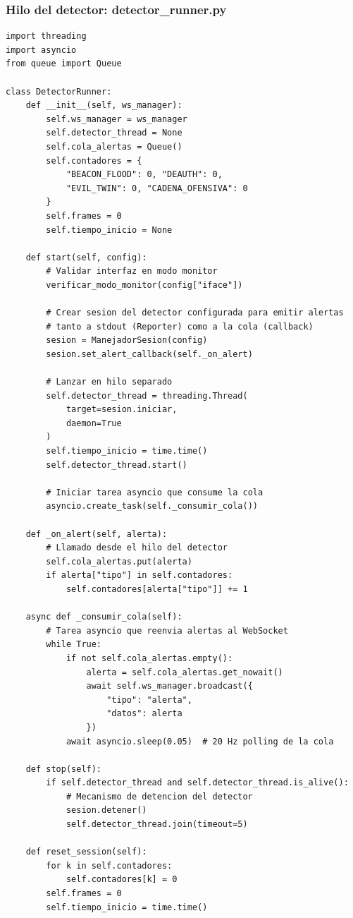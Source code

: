 \documentclass[11pt,a4paper]{article}
\begin{document}
\subsubsection{Hilo del detector: detector_runner.py}

\begin{lstlisting}
import threading
import asyncio
from queue import Queue

class DetectorRunner:
    def __init__(self, ws_manager):
        self.ws_manager = ws_manager
        self.detector_thread = None
        self.cola_alertas = Queue()
        self.contadores = {
            "BEACON_FLOOD": 0, "DEAUTH": 0,
            "EVIL_TWIN": 0, "CADENA_OFENSIVA": 0
        }
        self.frames = 0
        self.tiempo_inicio = None

    def start(self, config):
        # Validar interfaz en modo monitor
        verificar_modo_monitor(config["iface"])

        # Crear sesion del detector configurada para emitir alertas
        # tanto a stdout (Reporter) como a la cola (callback)
        sesion = ManejadorSesion(config)
        sesion.set_alert_callback(self._on_alert)

        # Lanzar en hilo separado
        self.detector_thread = threading.Thread(
            target=sesion.iniciar,
            daemon=True
        )
        self.tiempo_inicio = time.time()
        self.detector_thread.start()

        # Iniciar tarea asyncio que consume la cola
        asyncio.create_task(self._consumir_cola())

    def _on_alert(self, alerta):
        # Llamado desde el hilo del detector
        self.cola_alertas.put(alerta)
        if alerta["tipo"] in self.contadores:
            self.contadores[alerta["tipo"]] += 1

    async def _consumir_cola(self):
        # Tarea asyncio que reenvia alertas al WebSocket
        while True:
            if not self.cola_alertas.empty():
                alerta = self.cola_alertas.get_nowait()
                await self.ws_manager.broadcast({
                    "tipo": "alerta",
                    "datos": alerta
                })
            await asyncio.sleep(0.05)  # 20 Hz polling de la cola

    def stop(self):
        if self.detector_thread and self.detector_thread.is_alive():
            # Mecanismo de detencion del detector
            sesion.detener()
            self.detector_thread.join(timeout=5)

    def reset_session(self):
        for k in self.contadores:
            self.contadores[k] = 0
        self.frames = 0
        self.tiempo_inicio = time.time()
\end{lstlisting}
\end{document}
